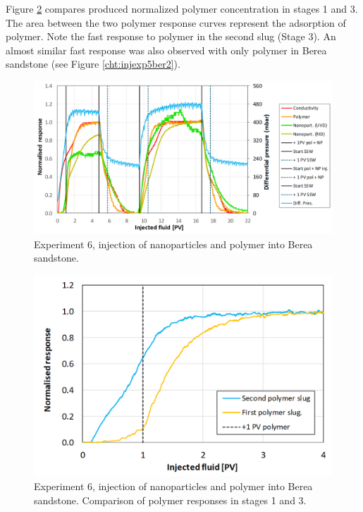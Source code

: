 Figure \ref{cht:injexp6ber2} compares produced normalized polymer concentration in stages 1 and 3. The area between the two polymer response curves represent the adsorption of polymer. Note the fast response to polymer in the second slug (Stage 3). An almost similar fast response was also observed with only polymer in Berea sandstone (see Figure \ref{cht:injexp5ber2}).

\begin{figure}[p]
    \centering
    \includegraphics[width=\textwidth]{img/cht/injexp6ber1.png}
    \caption{Experiment 6, injection of nanoparticles and polymer into Berea sandstone.}
    \label{cht:injexp6ber1}
\end{figure}

\begin{figure}[p]
    \centering
    \includegraphics[width=\textwidth]{img/cht/injexp6ber2.png}
    \caption{Experiment 6, injection of nanoparticles and polymer into Berea sandstone. Comparison of polymer responses in stages 1 and 3.}
    \label{cht:injexp6ber2}
\end{figure}


